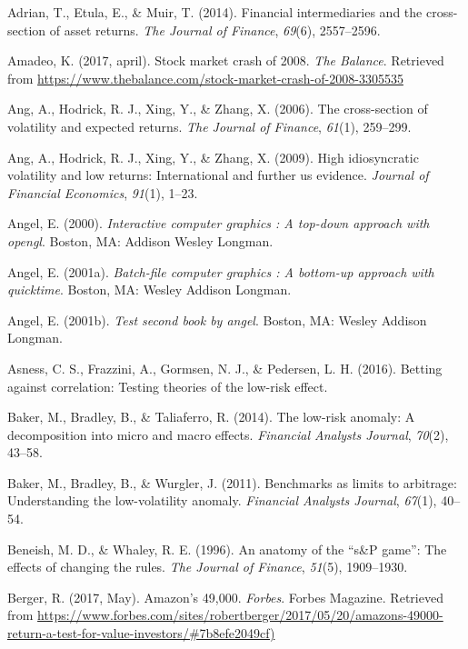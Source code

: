 \documentclass[12pt,twoside]{reedthesis}
\theoremstyle{definition}
\theoremstyle{definition}
\theoremstyle{definition}
\theoremstyle{remark}
\begin{document}
\hypertarget{refs}{}
\hypertarget{ref-adrian2014}{}
Adrian, T., Etula, E., \& Muir, T. (2014). Financial intermediaries and
the cross-section of asset returns. \emph{The Journal of Finance},
\emph{69}(6), 2557--2596.

\hypertarget{ref-amadeo2017}{}
Amadeo, K. (2017, april). Stock market crash of 2008. \emph{The
Balance}. Retrieved from
\url{https://www.thebalance.com/stock-market-crash-of-2008-3305535}

\hypertarget{ref-ang2006}{}
Ang, A., Hodrick, R. J., Xing, Y., \& Zhang, X. (2006). The
cross-section of volatility and expected returns. \emph{The Journal of
Finance}, \emph{61}(1), 259--299.

\hypertarget{ref-ang2009}{}
Ang, A., Hodrick, R. J., Xing, Y., \& Zhang, X. (2009). High
idiosyncratic volatility and low returns: International and further us
evidence. \emph{Journal of Financial Economics}, \emph{91}(1), 1--23.

\hypertarget{ref-angel2000}{}
Angel, E. (2000). \emph{Interactive computer graphics : A top-down
approach with opengl}. Boston, MA: Addison Wesley Longman.

\hypertarget{ref-angel2001}{}
Angel, E. (2001a). \emph{Batch-file computer graphics : A bottom-up
approach with quicktime}. Boston, MA: Wesley Addison Longman.

\hypertarget{ref-angel2002a}{}
Angel, E. (2001b). \emph{Test second book by angel}. Boston, MA: Wesley
Addison Longman.

\hypertarget{ref-asness2016}{}
Asness, C. S., Frazzini, A., Gormsen, N. J., \& Pedersen, L. H. (2016).
Betting against correlation: Testing theories of the low-risk effect.

\hypertarget{ref-baker2014}{}
Baker, M., Bradley, B., \& Taliaferro, R. (2014). The low-risk anomaly:
A decomposition into micro and macro effects. \emph{Financial Analysts
Journal}, \emph{70}(2), 43--58.

\hypertarget{ref-baker2011}{}
Baker, M., Bradley, B., \& Wurgler, J. (2011). Benchmarks as limits to
arbitrage: Understanding the low-volatility anomaly. \emph{Financial
Analysts Journal}, \emph{67}(1), 40--54.

\hypertarget{ref-beneish1996}{}
Beneish, M. D., \& Whaley, R. E. (1996). An anatomy of the ``s\&P
game'': The effects of changing the rules. \emph{The Journal of
Finance}, \emph{51}(5), 1909--1930.

\hypertarget{ref-berger2017}{}
Berger, R. (2017, May). Amazon's 49,000. \emph{Forbes}. Forbes Magazine.
Retrieved from
\url{https://www.forbes.com/sites/robertberger/2017/05/20/amazons-49000-return-a-test-for-value-investors/\#7b8efe2049cf)}
\end{document}
